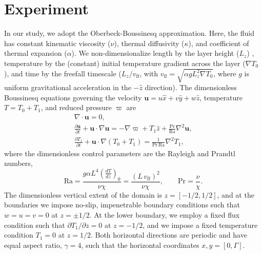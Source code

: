 \documentclass[aps, pre, onecolumn, nofootinbib, notitlepage, groupedaddress, amsfonts, amssymb, amsmath, longbibliography]{revtex4-1}
\newcommand{\DivU}{\ensuremath{\nabla\cdot\bm{u}}}
\newcommand{\grad}{\ensuremath{\nabla}}
\begin{document}
\section{Experiment}
\label{sec:experiment}
In our study, we adopt the Oberbeck-Boussinesq approximation.  Here, the
fluid has constant kinematic viscosity ($\nu$), thermal diffusivity ($\kappa$), and coefficient
of thermal expansion ($\alpha$).  We non-dimensionalize length by the layer height ($L_z$) ,
temperature by the (constant) initial temperature gradient across the layer ($\grad T_0$), and time
by the freefall timescale ($L_z / v_{\text{ff}}$, with $v_{\text{ff}} = \sqrt{\alpha g L_z^2 \grad T_0}$, where $g$ is 
uniform gravitational acceleration in the $-\hat{z}$ direction). The dimensionless Boussinesq
equations governing the velocity $\bm{u} = u\hat{x} + v\hat{y} + w\hat{z}$, temperature
$T = T_0 + T_1$, and reduced pressure $\varpi$ are \cite{spiegel&veronis1960}
\begin{gather}
\DivU = 0, 
	\label{eqn:incompressible}
\\
\frac{\partial \bm{u}}{\partial t} + \bm{u}\cdot\grad\bm{u} =
-\grad\varpi + T_1\hat{z} + \frac{\text{Pr}}{\text{Ra}}\grad^2\bm{u}, 
	\label{eqn:bouss_momentum}
\\
\frac{\partial T_1}{\partial t} + \bm{u}\cdot\grad(T_0 + T_1) = \frac{1}{\text{Pr}\,\text{Ra}}\grad^2 T_1,
	\label{eqn:bouss_energy}
\end{gather}
where the dimensionless control parameters are the Rayleigh and Prandtl numbers,
\begin{equation}
\text{Ra} = \frac{g \alpha L^4 \left(\frac{dT}{dz}\right)_0}{\nu\chi} = \frac{(L\,v_{\text{ff}})^2}{\nu\chi}, \qquad \text{Pr} = \frac{\nu}{\chi}.
\end{equation}
The dimensionless vertical extent of the domain is $z = [-1/2, 1/2]$, and at the boundaries
we impose no-slip, impenetrable boundary conditions such that $w = u = v = 0$ at $z = \pm 1/2$.
At the lower boundary, we employ a fixed flux condition such that $\partial T_1 / \partial z = 0$
at $z = -1/2$, and we impose a fixed temperature condition $T_1 = 0$ at $z = 1/2$. Both
horizontal directions are periodic and have equal aspect ratio, $\gamma = 4$, such that
the horizontal coordinates $x, y = [0, \Gamma]$.
\end{document}
